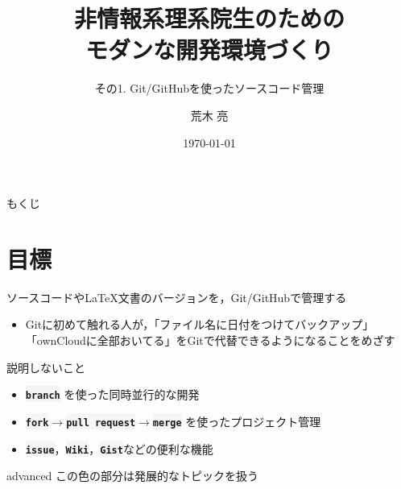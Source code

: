 \documentclass[12pt,dvipdfmx,svgnames,uplatex,aspectratio=169]{beamer}
\title{非情報系理系院生のための \\
  モダンな開発環境づくり}
\subtitle{その1. Git/GitHubを使ったソースコード管理}
\author{荒木 亮}
\institute{阪大院基礎工・後藤研}
\date{\today}
\newcommand{\git}[1]{{\colorbox{WhiteSmoke}{\texttt{\textbf{#1}}}}}  %
\begin{document}
\frame{\maketitle}
\begin{frame}{もくじ}
  \tableofcontents
\end{frame}

\section{目標}
\begin{frame}{\insertsection}
  \begin{screen}
    \centering
    ソースコードやLaTeX文書のバージョンを，Git/GitHubで管理する
  \end{screen}

  \begin{itemize}
    \item Gitに初めて触れる人が，「ファイル名に日付をつけてバックアップ」\\「ownCloudに全部おいてる」をGitで代替できるようになることをめざす
  \end{itemize}

  \begin{alertblock}{説明しないこと}
    \begin{itemize}
      \item \git{branch} を使った同時並行的な開発
      \item \git{fork}\(\to\)\git{pull request}\(\to\)\git{merge} を使ったプロジェクト管理
      \item \git{issue}，\git{Wiki}，\git{Gist}などの便利な機能
    \end{itemize}
    \begin{beamercolorbox}[rounded=true]{advanced}
      \footnotesize{この色の部分は発展的なトピックを扱う}
    \end{beamercolorbox}
  \end{alertblock}
\end{frame}
\end{document}
